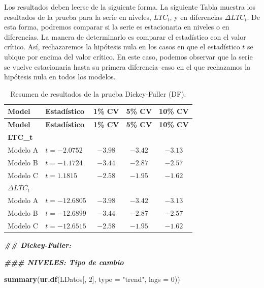 \documentclass[
]{book}
\newenvironment{Shaded}{\begin{snugshade}}{\end{snugshade}}
\newcommand{\AttributeTok}[1]{\textcolor[rgb]{0.13,0.29,0.53}{#1}}
\newcommand{\DecValTok}[1]{\textcolor[rgb]{0.00,0.00,0.81}{#1}}
\newcommand{\DocumentationTok}[1]{\textcolor[rgb]{0.56,0.35,0.01}{\textbf{\textit{#1}}}}
\newcommand{\FunctionTok}[1]{\textcolor[rgb]{0.13,0.29,0.53}{\textbf{#1}}}
\newcommand{\NormalTok}[1]{#1}
\newcommand{\StringTok}[1]{\textcolor[rgb]{0.31,0.60,0.02}{#1}}
\begin{document}
Los resultados deben leerse de la siguiente forma. La siguiente Tabla muestra los resultados de la prueba para la serie en niveles, \(LTC_t\), y en diferencias \(\Delta LTC_t\). De esta forma, podremos comparar si la serie es estacionaria en niveles o en diferencias. La manera de determinarlo es comparar el estadístico con el valor crítico. Así, rechazaremos la hipótesis nula en los casos en que el estadístico \(t\) se ubique por encima del valor crítico. En este caso, podemos observar que la serie se vuelve estacionaria hasta su primera diferencia--caso en el que rechazamos la hipótesis nula en todos los modelos.

\begin{longtable}[]{@{}llccc@{}}
\caption{\label{tab:DF-summary} Resumen de resultados de la prueba Dickey-Fuller (DF).}\tabularnewline
\toprule\noalign{}
\textbf{Model} & \textbf{Estadístico} & \textbf{1\% CV} & \textbf{5\% CV} & \textbf{10\% CV} \\
\midrule\noalign{}
\endfirsthead
\toprule\noalign{}
\textbf{Model} & \textbf{Estadístico} & \textbf{1\% CV} & \textbf{5\% CV} & \textbf{10\% CV} \\
\midrule\noalign{}
\endhead
\bottomrule\noalign{}
\endlastfoot
\textbf{LTC\_t} & & & & \\
Modelo A & \(t=-2.0752\) & \(-3.98\) & \(-3.42\) & \(-3.13\) \\
Modelo B & \(t=-1.1724\) & \(-3.44\) & \(-2.87\) & \(-2.57\) \\
Modelo C & \(t=1.1815\) & \(-2.58\) & \(-1.95\) & \(-1.62\) \\
\textbf{\(\Delta LTC_t\)} & & & & \\
Modelo A & \(t=-12.6805\) & \(-3.98\) & \(-3.42\) & \(-3.13\) \\
Modelo B & \(t=-12.6899\) & \(-3.44\) & \(-2.87\) & \(-2.57\) \\
Modelo C & \(t=-12.6515\) & \(-2.58\) & \(-1.95\) & \(-1.62\) \\
\end{longtable}

\begin{Shaded}
\begin{Highlighting}[]
\DocumentationTok{\#\# Dickey{-}Fuller:}

\DocumentationTok{\#\#\# NIVELES: Tipo de cambio}

\FunctionTok{summary}\NormalTok{(}\FunctionTok{ur.df}\NormalTok{(LDatos[, }\DecValTok{2}\NormalTok{], }\AttributeTok{type =} \StringTok{"trend"}\NormalTok{, }\AttributeTok{lags =} \DecValTok{0}\NormalTok{))}
\end{Highlighting}
\end{Shaded}
\end{document}
